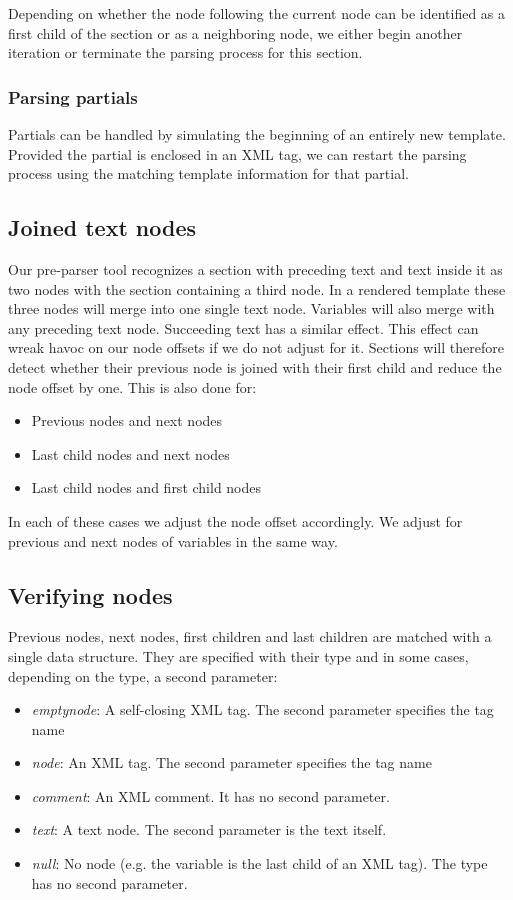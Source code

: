 \documentclass[thesis.tex]{subfiles}
\begin{document}
Depending on whether the node following the current node can be identified as
a first child of the section or as a neighboring node, we either begin another
iteration or terminate the parsing process for this section.

\subsubsection{Parsing partials}
\label{sec:parsing-partials}
Partials can be handled by simulating the beginning of an entirely new template.
Provided the partial is enclosed in an XML tag, we can
restart the parsing process using the matching template information for that
partial.

\subsection{Joined text nodes}
\label{sec:joined}
Our pre-parser tool recognizes a section with preceding text and text inside it
as two nodes with the section containing a third node. In a rendered template
these three nodes will merge into one single text node. Variables will also
merge with any preceding text node. Succeeding text has a similar effect.
This effect can wreak havoc on our node offsets if we do not adjust for it.
Sections will therefore detect whether their previous node is joined with
their first child and reduce the node offset by one. This is also done for:
\begin{itemize}
\item Previous nodes and next nodes
\item Last child nodes and next nodes
\item Last child nodes and first child nodes
\end{itemize}

In each of these cases we adjust the node offset accordingly. We adjust
for previous and next nodes of variables in the same way.

\subsection{Verifying nodes}
Previous nodes, next nodes, first children and last children are matched with
a single data structure.
They are specified with their type and in some cases, depending on the type,
a second parameter:
\begin{itemize}
\item \emph{emptynode}: A self-closing XML tag. The second parameter specifies
                        the tag name
\item \emph{node}:      An XML tag. The second parameter specifies
                        the tag name
\item \emph{comment}:   An XML comment. It has no second parameter.
\item \emph{text}:      A text node. The second parameter is the text itself.
\item \emph{null}:      No node (e.g. the variable is the
                        last child of an XML tag). The type has no second
                        parameter.
\end{itemize}
\end{document}
